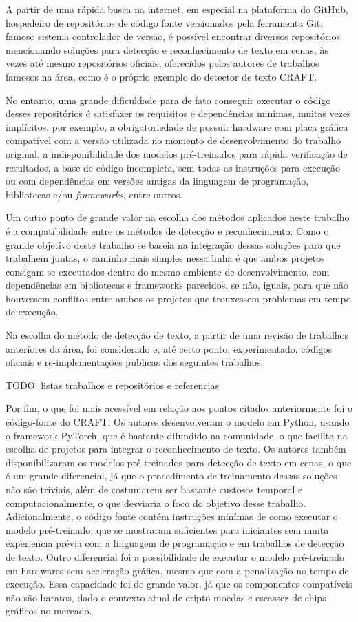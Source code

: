 A partir de uma rápida busca na internet, em especial na plataforma do GitHub, hospedeiro de repositórios de código fonte versionados pela ferramenta Git, famoso sistema controlador de versão, é possível encontrar diversos repositórios mencionando soluções para detecção e reconhecimento de texto em cenas, às vezes até mesmo repositórios oficiais, oferecidos pelos autores de trabalhos famosos na área, como é o próprio exemplo do detector de texto CRAFT.

No entanto, uma grande dificuldade para de fato conseguir executar o código desses repositórios é satisfazer os requisitos e dependências minímas, muitas vezes implícitos, por exemplo, a obrigatoriedade de possuir hardware com placa gráfica compatível com a versão utilizada no momento de desenvolvimento do trabalho original, a indisponibilidade dos modelos pré-treinados para rápida verificação de resultados, a base de código incompleta, sem todas as instruções para execução ou com dependências em versões antigas da linguagem de programação, bibliotecas e/ou \textit{frameworks}, entre outros.

Um outro ponto de grande valor na escolha dos métodos aplicados neste trabalho é a compatibilidade entre os métodos de detecção e reconhecimento. Como o grande objetivo deste trabalho se baseia na integração dessas soluções para que trabalhem juntas, o caminho mais simples nessa linha é que ambos projetos consigam se executados dentro do mesmo ambiente de desenvolvimento, com dependências em bibliotecas e frameworks parecidos, se não, iguais, para que não houvessem conflitos entre ambos os projetos que trouxessem problemas em tempo de execução.

Na escolha do método de detecção de texto, a partir de uma revisão de trabalhos anteriores da área, foi considerado e, até certo ponto, experimentado, códigos oficiais e re-implementações publicas dos seguintes trabalhos:

{{TODO: listas trabalhos e repositórios e referencias }}

Por fim, o que foi mais acessível em relação aos pontos citados anteriormente foi o código-fonte do CRAFT. Os autores desenvolveram o modelo em Python, usando o framework PyTorch, que é bastante difundido na comunidade, o que facilita na escolha de projetos para integrar o reconhecimento de texto. Os autores também disponibilizaram os modelos pré-treinados para detecção de texto em cenas, o que é um grande diferencial, já que o procedimento de treinamento dessas soluções não são triviais, além de costumarem ser bastante custosos temporal e computacionalmente, o que desviaria o foco do objetivo desse trabalho. Adicionalmente, o código fonte contém instruções minímas de como executar o modelo pré-treinado, que se mostraram suficientes para iniciantes sem muita experiencia prévia com a linguagem de programação e em trabalhos de detecção de texto. Outro diferencial foi a possibilidade de executar o modelo pré-treinado em hardwares sem aceleração gráfica, mesmo que com a penalização no tempo de execução. Essa capacidade foi de grande valor, já que os componentes compatíveis não são baratos, dado o contexto atual de cripto moedas e escassez de chips gráficos no mercado.

